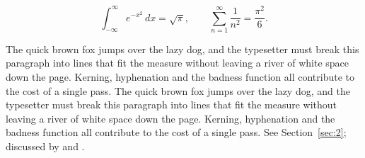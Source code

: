 \documentclass{article}
\begin{document}
\begin{equation}\label{eq:2}
\int_{-\infty}^{\infty} e^{-x^{2}}\,dx = \sqrt{\pi}, \qquad
\sum_{n=1}^{\infty} \frac{1}{n^{2}} = \frac{\pi^{2}}{6}.
\end{equation}

The quick brown fox jumps over the lazy dog, and the typesetter must break this paragraph into lines that fit the measure without leaving a river of white space down the page. Kerning, hyphenation and the badness function all contribute to the cost of a single pass. The quick brown fox jumps over the lazy dog, and the typesetter must break this paragraph into lines that fit the measure without leaving a river of white space down the page. Kerning, hyphenation and the badness function all contribute to the cost of a single pass. 
See Section~\ref{sec:2}; discussed by \textcite{k3} and \textcite{l5}.
\printbibliography
\end{document}

